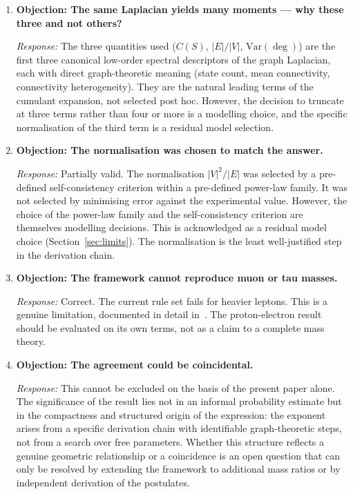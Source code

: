 \documentclass[12pt]{article}
\begin{document}
\begin{enumerate}
    \item \textbf{Objection: The same Laplacian yields many moments --- why these three and not others?}

    \textit{Response:} The three quantities used ($C(S)$, $|E|/|V|$, $\mathrm{Var}(\deg)$) are the first three canonical low-order spectral descriptors of the graph Laplacian, each with direct graph-theoretic meaning (state count, mean connectivity, connectivity heterogeneity). They are the natural leading terms of the cumulant expansion, not selected post hoc. However, the decision to truncate at three terms rather than four or more is a modelling choice, and the specific normalisation of the third term is a residual model selection.

    \item \textbf{Objection: The normalisation was chosen to match the answer.}

    \textit{Response:} Partially valid. The normalisation $|V|^2/|E|$ was selected by a pre-defined self-consistency criterion within a pre-defined power-law family. It was not selected by minimising error against the experimental value. However, the choice of the power-law family and the self-consistency criterion are themselves modelling decisions. This is acknowledged as a residual model choice (Section~\ref{sec:limits}). The normalisation is the least well-justified step in the derivation chain.

    \item \textbf{Objection: The framework cannot reproduce muon or tau masses.}

    \textit{Response:} Correct. The current rule set fails for heavier leptons. This is a genuine limitation, documented in detail in~\citep{SmartII}. The proton-electron result should be evaluated on its own terms, not as a claim to a complete mass theory.

    \item \textbf{Objection: The agreement could be coincidental.}

    \textit{Response:} This cannot be excluded on the basis of the present paper alone. The significance of the result lies not in an informal probability estimate but in the compactness and structured origin of the expression: the exponent arises from a specific derivation chain with identifiable graph-theoretic steps, not from a search over free parameters. Whether this structure reflects a genuine geometric relationship or a coincidence is an open question that can only be resolved by extending the framework to additional mass ratios or by independent derivation of the postulates.


\end{enumerate}
\end{document}
